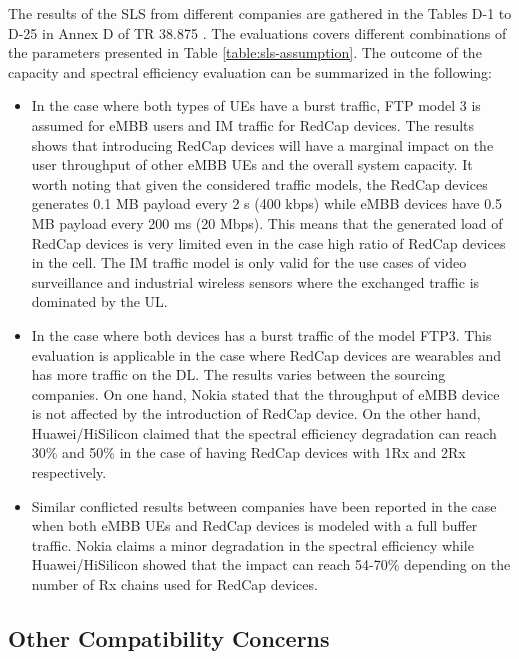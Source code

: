 \documentclass[conference]{IEEEtran}
\begin{document}
The results of the SLS from different companies are gathered in the Tables D-1 to D-25 in Annex D of TR 38.875 \cite{3gpp.38.875}. The evaluations covers different combinations of the parameters presented in Table \ref{table:sls-assumption}. The outcome of the capacity and spectral efficiency evaluation can be summarized in the following:

\begin{itemize}
    \item In the case where both types of UEs have a burst traffic, FTP model 3 is assumed for eMBB users and IM traffic for RedCap devices. The results shows that introducing RedCap devices will have a marginal impact on the user throughput of other eMBB UEs and the overall system capacity. It worth noting that given the considered traffic models, the RedCap devices generates 0.1 MB payload every 2 s (400 kbps) while eMBB devices have 0.5 MB payload every 200 ms (20 Mbps). This means that the generated load of RedCap devices is very limited even in the case high ratio of RedCap devices in the cell. The IM traffic model is only valid for the use cases of video surveillance and industrial wireless sensors where the exchanged traffic is dominated by the UL.
    \item In the case where both devices has a burst traffic of the model FTP3. This evaluation is applicable in the case where RedCap devices are wearables and has more traffic on the DL. The results varies between the sourcing companies. On one hand, Nokia stated that the throughput of eMBB device is not affected by the introduction of RedCap device. On the other hand, Huawei/HiSilicon claimed that the spectral efficiency degradation can reach 30\% and 50\% in the case of having RedCap devices with 1Rx and 2Rx respectively.
    \item Similar conflicted results between companies have been reported in the case when both eMBB UEs and RedCap devices is modeled with a full buffer traffic. Nokia claims a minor degradation in the spectral efficiency while Huawei/HiSilicon showed that the impact can reach 54-70\% depending on the number of Rx chains used for RedCap devices.
\end{itemize}





\subsection{Other Compatibility Concerns}
\end{document}
